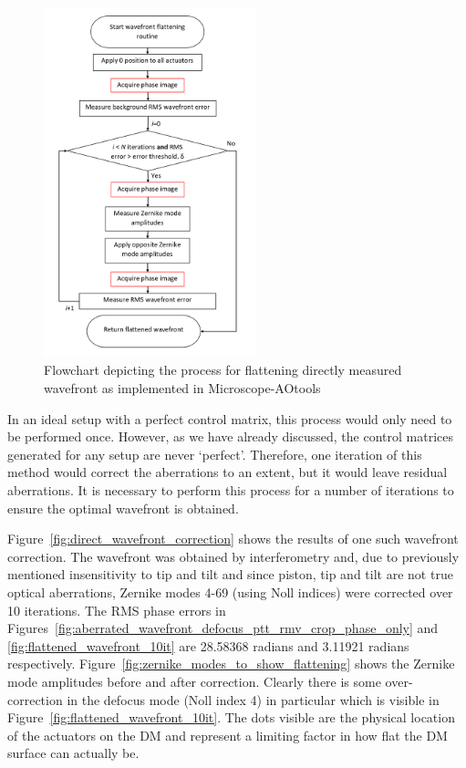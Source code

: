 \begin{figure}[h]
	\centering
	\includegraphics[width=0.55\textwidth, scale=0.5]{./images/direct_wavefront_flattening_workflow.png}
	\caption{Flowchart depicting the process for flattening directly measured wavefront as implemented in Microscope-AOtools}
	\label{fig:direct_wavefront_flattening_workflow}
\end{figure}

In an ideal setup with a perfect control matrix, this process would only need to be performed once. However, as we have already discussed, the control matrices generated for any setup are never `perfect'. Therefore, one iteration of this method would correct the aberrations to an extent, but it would leave residual aberrations. It is necessary to perform this process for a number of iterations to ensure the optimal wavefront is obtained. 

Figure~\ref{fig:direct_wavefront_correction} shows the results of one such wavefront correction. The wavefront was obtained by interferometry and, due to previously mentioned insensitivity to tip and tilt and since piston, tip and tilt are not true optical aberrations, Zernike modes 4-69 (using Noll indices) were corrected over 10 iterations. The RMS phase errors in Figures~\ref{fig:aberrated_wavefront_defocus_ptt_rmv_crop_phase_only} and \ref{fig:flattened_wavefront_10it} are 28.58368 radians and 3.11921 radians respectively. Figure~\ref{fig:zernike_modes_to_show_flattening} shows the Zernike mode amplitudes before and after correction. Clearly there is some over-correction in the defocus mode (Noll index 4) in particular which is visible in Figure~\ref{fig:flattened_wavefront_10it}. The dots visible are the physical location of the actuators on the DM and represent a limiting factor in how flat the DM surface can actually be. 

